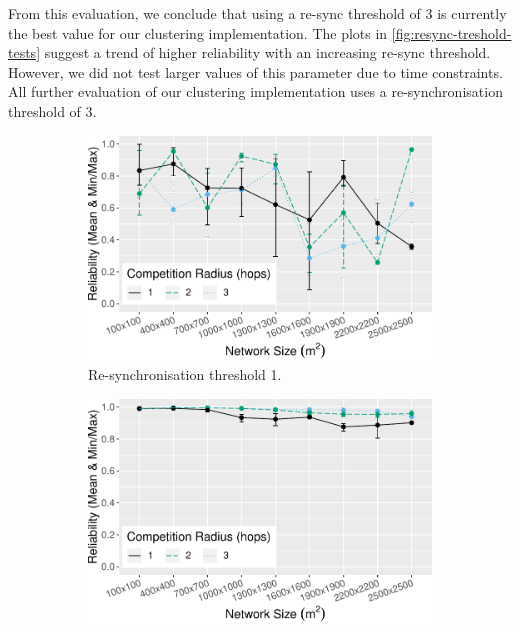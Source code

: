 From this evaluation, we conclude that using a re-sync threshold of 3 is currently the best value for our clustering implementation. The plots in \cref{fig:resync-treshold-tests} suggest a trend of higher reliability with an increasing re-sync threshold. However, we did not test larger values of this parameter due to time constraints. All further evaluation of our clustering implementation uses a re-synchronisation threshold of 3.

\begin{figure}[bt]
\centering
\begin{subfigure}{\textwidth}
    \centering
    \includegraphics[width=\textwidth, keepaspectratio]{figure/Results/ParameterEvaluation/ResyncThreshold1_Reliability.pdf}
    \caption{Re-synchronisation threshold 1.}
    \label{subfig:resync-treshold-1}
\end{subfigure}
\begin{subfigure}{\textwidth}
    \centering
    \includegraphics[width=\textwidth, keepaspectratio]{figure/Results/ParameterEvaluation/ResyncThreshold2_Reliability.pdf}

\end{subfigure}
\end{figure}
